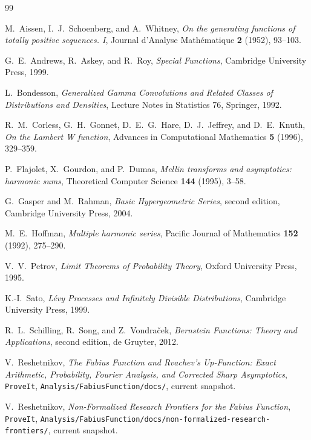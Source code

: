 \documentclass[11pt]{article}
\numberwithin{equation}{section}
\theoremstyle{definition}
\theoremstyle{remark}
\begin{document}
\begin{thebibliography}{99}

M.~Aissen, I.~J.~Schoenberg, and A.~Whitney,
\emph{On the generating functions of totally positive sequences. I},
Journal d'Analyse Math\'ematique \textbf{2} (1952), 93--103.

G.~E.~Andrews, R.~Askey, and R.~Roy,
\emph{Special Functions}, Cambridge University Press, 1999.

L.~Bondesson,
\emph{Generalized Gamma Convolutions and Related Classes of Distributions and
Densities}, Lecture Notes in Statistics 76, Springer, 1992.

R.~M.~Corless, G.~H.~Gonnet, D.~E.~G.~Hare, D.~J.~Jeffrey, and D.~E.~Knuth,
\emph{On the Lambert W function}, Advances in Computational Mathematics
\textbf{5} (1996), 329--359.

P.~Flajolet, X.~Gourdon, and P.~Dumas,
\emph{Mellin transforms and asymptotics: harmonic sums},
Theoretical Computer Science \textbf{144} (1995), 3--58.

G.~Gasper and M.~Rahman,
\emph{Basic Hypergeometric Series}, second edition, Cambridge University Press,
2004.

M.~E.~Hoffman,
\emph{Multiple harmonic series}, Pacific Journal of Mathematics
\textbf{152} (1992), 275--290.

V.~V.~Petrov,
\emph{Limit Theorems of Probability Theory}, Oxford University Press, 1995.

K.-I.~Sato,
\emph{L\'evy Processes and Infinitely Divisible Distributions},
Cambridge University Press, 1999.

R.~L.~Schilling, R.~Song, and Z.~Vondra\v{c}ek,
\emph{Bernstein Functions: Theory and Applications}, second edition,
de Gruyter, 2012.

V.~Reshetnikov,
\emph{The Fabius Function and Rvachev's Up-Function: Exact Arithmetic,
Probability, Fourier Analysis, and Corrected Sharp Asymptotics},
\texttt{ProveIt}, \nolinkurl{Analysis/FabiusFunction/docs/}, current snapshot.

V.~Reshetnikov,
\emph{Non-Formalized Research Frontiers for the Fabius Function},
\texttt{ProveIt}, \nolinkurl{Analysis/FabiusFunction/docs/non-formalized-research-frontiers/},
current snapshot.

\end{thebibliography}
\end{document}
